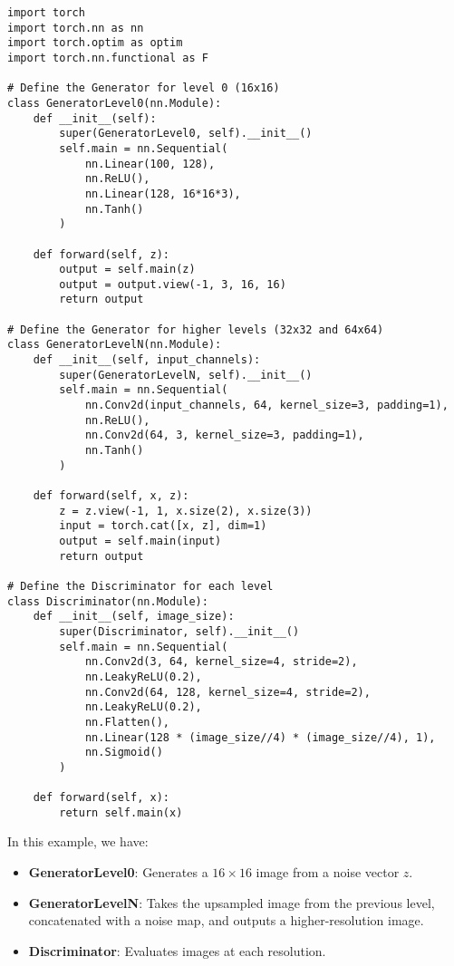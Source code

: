 \begin{lstlisting}[style=python]
import torch
import torch.nn as nn
import torch.optim as optim
import torch.nn.functional as F

# Define the Generator for level 0 (16x16)
class GeneratorLevel0(nn.Module):
    def __init__(self):
        super(GeneratorLevel0, self).__init__()
        self.main = nn.Sequential(
            nn.Linear(100, 128),
            nn.ReLU(),
            nn.Linear(128, 16*16*3),
            nn.Tanh()
        )
    
    def forward(self, z):
        output = self.main(z)
        output = output.view(-1, 3, 16, 16)
        return output

# Define the Generator for higher levels (32x32 and 64x64)
class GeneratorLevelN(nn.Module):
    def __init__(self, input_channels):
        super(GeneratorLevelN, self).__init__()
        self.main = nn.Sequential(
            nn.Conv2d(input_channels, 64, kernel_size=3, padding=1),
            nn.ReLU(),
            nn.Conv2d(64, 3, kernel_size=3, padding=1),
            nn.Tanh()
        )
    
    def forward(self, x, z):
        z = z.view(-1, 1, x.size(2), x.size(3))
        input = torch.cat([x, z], dim=1)
        output = self.main(input)
        return output

# Define the Discriminator for each level
class Discriminator(nn.Module):
    def __init__(self, image_size):
        super(Discriminator, self).__init__()
        self.main = nn.Sequential(
            nn.Conv2d(3, 64, kernel_size=4, stride=2),
            nn.LeakyReLU(0.2),
            nn.Conv2d(64, 128, kernel_size=4, stride=2),
            nn.LeakyReLU(0.2),
            nn.Flatten(),
            nn.Linear(128 * (image_size//4) * (image_size//4), 1),
            nn.Sigmoid()
        )
    
    def forward(self, x):
        return self.main(x)
\end{lstlisting}

In this example, we have:

\begin{itemize}
    \item \textbf{GeneratorLevel0}: Generates a \( 16 \times 16 \) image from a noise vector \( z \).
    \item \textbf{GeneratorLevelN}: Takes the upsampled image from the previous level, concatenated with a noise map, and outputs a higher-resolution image.
    \item \textbf{Discriminator}: Evaluates images at each resolution.
\end{itemize}

